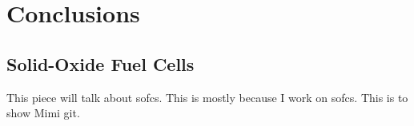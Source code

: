 


\chapter{Conclusions}

\section{Solid-Oxide Fuel Cells}

This piece will talk about \glspl{sofc}.
This is mostly because I work on \glspl{sofc}.
This is to show Mimi git.
\lipsum\cite{Wang2006a}
